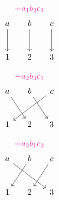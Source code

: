 \documentclass[../../../topic_linear-algebra]{subfiles}
\begin{document}
\begin{tcbraster}[raster columns=3]
  \begin{tcolorbox}[empty]
    \begin{equation*}
      \begin{gathered}
        \textcolor{Rhodamine}{+a_1b_2c_3} \\
        \begin{tikzcd}[column sep=3ex, row sep=large]
          a\arrow[d] & b\arrow[d] & c\arrow[d] \\
          1 & 2 & 3
        \end{tikzcd}
      \end{gathered}
    \end{equation*}
  \end{tcolorbox}
  \begin{tcolorbox}[empty]
    \begin{equation*}
      \begin{gathered}
        \textcolor{Rhodamine}{+a_2b_3c_1} \\
        \begin{tikzcd}[column sep=3ex, row sep=large]
          a\arrow[rd] & b\arrow[rd] & c\arrow[lld] \\
          1 & 2 & 3
        \end{tikzcd}
      \end{gathered}
    \end{equation*}
  \end{tcolorbox}
  \begin{tcolorbox}[empty]
    \begin{equation*}
      \begin{gathered}
        \textcolor{Rhodamine}{+a_3b_1c_2} \\
        \begin{tikzcd}[column sep=3ex, row sep=large]
          a\arrow[rrd] & b\arrow[ld] & c\arrow[ld] \\
          1 & 2 & 3
        \end{tikzcd}
      \end{gathered}
    \end{equation*}
  \end{tcolorbox}
  \begin{tcolorbox}[empty]
    \begin{equation*}
      \begin{gathered}

\end{gathered}
\end{equation*}
\end{tcolorbox}
\end{tcbraster}
\end{document}
